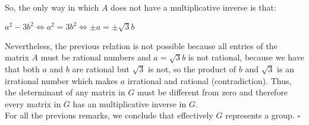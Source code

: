 \documentclass[a4paper,openany,11pt]{book}
\begin{document}
So, the only way in which $A$ does not have a multiplicative inverse is that:

\begin{center}
	$a^{2}-3b^{2} \iff a^{2} = 3b^{2} \iff \pm a = \pm \sqrt{3}b$
\end{center}

Nevertheless, the previous relation is not possible because all entries of the matrix $A$ must be rational numbers and $a = \sqrt{3}b$ is not rational, because we have that both $a$ and $b$ are rational but $\sqrt{3}$ is not, so the product of $b$ and $\sqrt{3}$ is an irrational number which makes $a$ irrational and rational (contradiction). Thus, the determinant of any matrix in $G$ must be different from zero and therefore every matrix in $G$ has an multiplicative inverse in $G$.\\

For all the previous remarks, we conclude that effectively $G$ represents a group. \hspace{0.1cm} $\square$ 
\end{document}
